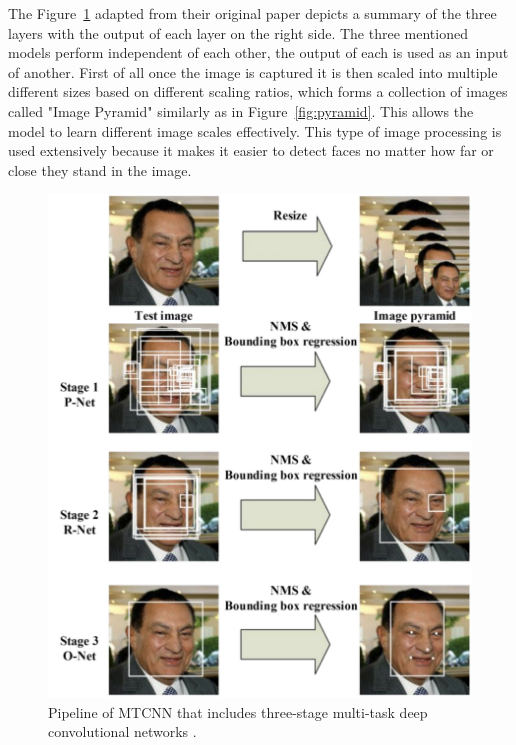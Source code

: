 The Figure~\ref{fig:mtcnn} adapted from their original paper depicts a summary of the three layers with the output of each layer on the right side. The three mentioned models perform independent of each other, the output of each is used as an input of another. 
First of all once the image is captured it is then scaled into multiple different sizes based on different scaling ratios, which forms a collection of images called "Image Pyramid" similarly as in Figure~\ref{fig:pyramid}. This allows the model to learn different image scales effectively. This type of image processing is used extensively because it makes it easier to detect faces no matter how far or close they stand in the image.


\begin{figure}[!htb]
    \centering
    \includegraphics[width=1\textwidth]{figures/mtcnn.png}
    \caption{ Pipeline of MTCNN that includes three-stage multi-task deep convolutional networks \cite{refmtcnn}.}
    \label{fig:mtcnn}
\end{figure}

